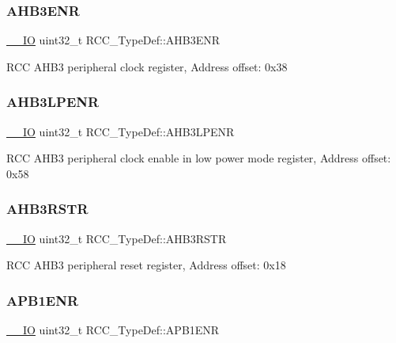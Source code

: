 \subsubsection{\texorpdfstring{A\+H\+B3\+E\+NR}{AHB3ENR}}
{\footnotesize\ttfamily \hyperlink{core__sc300_8h_aec43007d9998a0a0e01faede4133d6be}{\+\_\+\+\_\+\+IO} uint32\+\_\+t R\+C\+C\+\_\+\+Type\+Def\+::\+A\+H\+B3\+E\+NR}

R\+CC A\+H\+B3 peripheral clock register, Address offset\+: 0x38 \mbox{\label{struct_r_c_c___type_def_a95edda857c3725bfb410d3a4707edfd8}} 
\subsubsection{\texorpdfstring{A\+H\+B3\+L\+P\+E\+NR}{AHB3LPENR}}
{\footnotesize\ttfamily \hyperlink{core__sc300_8h_aec43007d9998a0a0e01faede4133d6be}{\+\_\+\+\_\+\+IO} uint32\+\_\+t R\+C\+C\+\_\+\+Type\+Def\+::\+A\+H\+B3\+L\+P\+E\+NR}

R\+CC A\+H\+B3 peripheral clock enable in low power mode register, Address offset\+: 0x58 \mbox{\label{struct_r_c_c___type_def_a39a90d838fbd0b8515f03e4a1be6374f}} 
\subsubsection{\texorpdfstring{A\+H\+B3\+R\+S\+TR}{AHB3RSTR}}
{\footnotesize\ttfamily \hyperlink{core__sc300_8h_aec43007d9998a0a0e01faede4133d6be}{\+\_\+\+\_\+\+IO} uint32\+\_\+t R\+C\+C\+\_\+\+Type\+Def\+::\+A\+H\+B3\+R\+S\+TR}

R\+CC A\+H\+B3 peripheral reset register, Address offset\+: 0x18 \mbox{\label{struct_r_c_c___type_def_aec7622ba90341c9faf843d9ee54a759f}} 
\subsubsection{\texorpdfstring{A\+P\+B1\+E\+NR}{APB1ENR}}
{\footnotesize\ttfamily \hyperlink{core__sc300_8h_aec43007d9998a0a0e01faede4133d6be}{\+\_\+\+\_\+\+IO} uint32\+\_\+t R\+C\+C\+\_\+\+Type\+Def\+::\+A\+P\+B1\+E\+NR}

